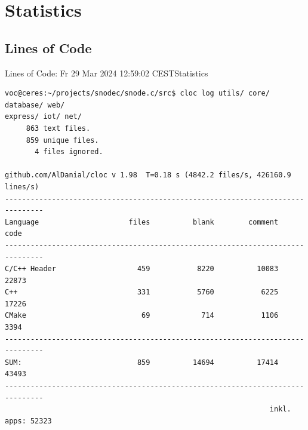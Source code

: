 ﻿\section{Statistics}
\subsection{Lines of Code}

\begin{frame}[fragile] {Lines of Code: Fr 29 Mar 2024 12:59:02 CEST}{Statistics}

\begin{center}
  \begin{BVerbatim}[fontsize=\small]
voc@ceres:~/projects/snodec/snode.c/src$ cloc log utils/ core/ database/ web/
express/ iot/ net/
     863 text files.
     859 unique files.
       4 files ignored.

github.com/AlDanial/cloc v 1.98  T=0.18 s (4842.2 files/s, 426160.9 lines/s)
-------------------------------------------------------------------------------
Language                     files          blank        comment           code
-------------------------------------------------------------------------------
C/C++ Header                   459           8220          10083          22873
C++                            331           5760           6225          17226
CMake                           69            714           1106           3394
-------------------------------------------------------------------------------
SUM:                           859          14694          17414          43493
-------------------------------------------------------------------------------
                                                              inkl. apps: 52323
  \end{BVerbatim}
\end{center}
\end{frame}
